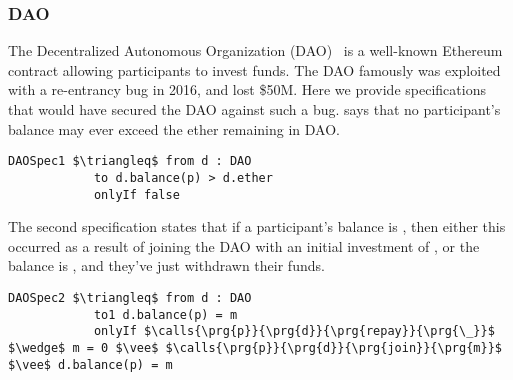\subsubsection{DAO}
The Decentralized Autonomous Organization (DAO)~\cite{Dao}  is a well-known Ethereum contract allowing 
participants to invest funds. The DAO famously was exploited with a re-entrancy bug in 2016, 
and lost \$50M. Here we provide specifications that would have secured the DAO against such a 
bug.  says that no participant's balance may ever exceed the ether remaining 
in DAO.
\begin{lstlisting}[language = Chainmail, mathescape=true, frame=lines]
DAOSpec1 $\triangleq$ from d : DAO
            to d.balance(p) > d.ether
            onlyIf false
\end{lstlisting}
The second specification  states that if a participant's balance is , then 
either this occurred as a result of joining the DAO with an initial investment of , or the
balance is , and they've just withdrawn their funds.
\begin{lstlisting}[language = Chainmail, mathescape=true, frame=lines]
DAOSpec2 $\triangleq$ from d : DAO
            to1 d.balance(p) = m
            onlyIf $\calls{\prg{p}}{\prg{d}}{\prg{repay}}{\prg{\_}}$ $\wedge$ m = 0 $\vee$ $\calls{\prg{p}}{\prg{d}}{\prg{join}}{\prg{m}}$ $\vee$ d.balance(p) = m
\end{lstlisting}
